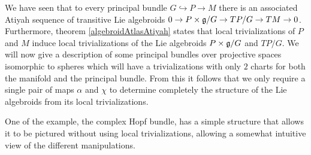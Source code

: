  We have seen that to every principal bundle $G \hookrightarrow P \to M$ there is an associated Atiyah sequence of transitive Lie algebroids $0 \to P \times \mathfrak{g} / G \to TP/G \to TM \to 0$. Furthermore, theorem \ref{algebroidAtlasAtiyah} states that local trivializations of $P$ and $M$ induce local trivializations of the Lie algebroids $P \times \mathfrak{g}/G$ and $TP/G$. We will now give a description of some principal bundles over projective spaces isomorphic to spheres which will have a trivializations with only $2$ charts for both the manifold and the principal bundle. From this it follows that we only require a single pair of maps $\alpha$ and $\chi$ to determine completely the structure of the Lie algebroids from its local trivializations.
    
    
    
    
    
    
    
One of the example, the complex Hopf bundle, has a simple structure that allows it to be pictured without using local trivializations, allowing a somewhat intuitive view of the different manipulations.%

